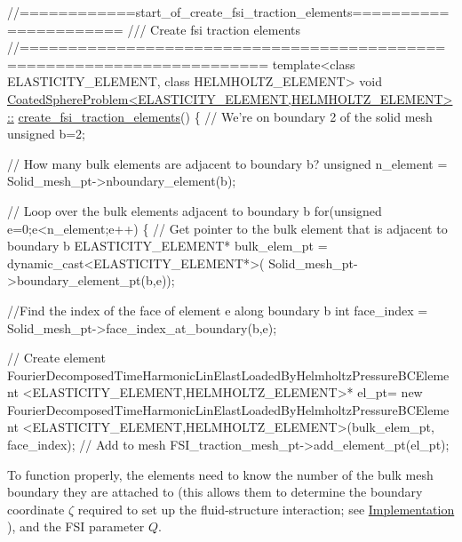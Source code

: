  
\begin{DoxyCodeInclude}
\textcolor{comment}{//============start\_of\_create\_fsi\_traction\_elements======================}
\textcolor{comment}{/// Create fsi traction elements }
\textcolor{comment}{}\textcolor{comment}{//=======================================================================}
\textcolor{keyword}{template}<\textcolor{keyword}{class} ELASTICITY\_ELEMENT, \textcolor{keyword}{class} HELMHOLTZ\_ELEMENT>
\textcolor{keywordtype}{void} \hyperlink{classCoatedSphereProblem_a2d342158b3058cd5392e2de3fd7595da}{CoatedSphereProblem<ELASTICITY\_ELEMENT,HELMHOLTZ\_ELEMENT>::}
\hyperlink{classCoatedSphereProblem_a2d342158b3058cd5392e2de3fd7595da}{create\_fsi\_traction\_elements}()
\{
 \textcolor{comment}{// We're on boundary 2 of the solid mesh}
 \textcolor{keywordtype}{unsigned} b=2;

 \textcolor{comment}{// How many bulk elements are adjacent to boundary b?}
 \textcolor{keywordtype}{unsigned} n\_element = Solid\_mesh\_pt->nboundary\_element(b);
 
 \textcolor{comment}{// Loop over the bulk elements adjacent to boundary b}
 \textcolor{keywordflow}{for}(\textcolor{keywordtype}{unsigned} e=0;e<n\_element;e++)
  \{
   \textcolor{comment}{// Get pointer to the bulk element that is adjacent to boundary b}
   ELASTICITY\_ELEMENT* bulk\_elem\_pt = \textcolor{keyword}{dynamic\_cast<}ELASTICITY\_ELEMENT*\textcolor{keyword}{>}(
    Solid\_mesh\_pt->boundary\_element\_pt(b,e));
   
   \textcolor{comment}{//Find the index of the face of element e along boundary b}
   \textcolor{keywordtype}{int} face\_index = Solid\_mesh\_pt->face\_index\_at\_boundary(b,e);
   
   \textcolor{comment}{// Create element}
   FourierDecomposedTimeHarmonicLinElastLoadedByHelmholtzPressureBCElement
    <ELASTICITY\_ELEMENT,HELMHOLTZ\_ELEMENT>* el\_pt=
    \textcolor{keyword}{new} FourierDecomposedTimeHarmonicLinElastLoadedByHelmholtzPressureBCElement
    <ELASTICITY\_ELEMENT,HELMHOLTZ\_ELEMENT>(bulk\_elem\_pt,
                                           face\_index);   
   \textcolor{comment}{// Add to mesh}
   FSI\_traction\_mesh\_pt->add\_element\_pt(el\_pt);

\end{DoxyCodeInclude}


To function properly, the elements need to know the number of the bulk mesh boundary they are attached to (this allows them to determine the boundary coordinate $ \zeta $ required to set up the fluid-\/structure interaction; see \hyperlink{index_impl}{Implementation} ), and the F\+SI parameter $ Q $.


